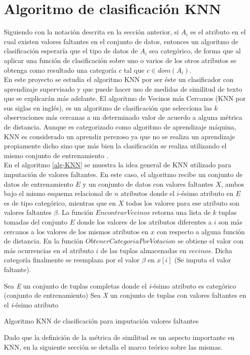\section{Algoritmo de clasificación KNN}
Siguiendo con la notación descrita en la sección anterior, si ${A_{i}}$ es el atributo en el cual existen valores faltantes en el conjunto de datos, entonces un algoritmo de clasificación esperaría que el tipo de datos de ${A_{i}}$ sea categórico, de forma que al aplicar una función de clasificación sobre uno o varios de los otros atributos se obtenga como resultado una categoría ${c}$ tal que ${c \in dom(A_{i})}$.\\
En este proyecto se estudia el algoritmo KNN por ser éste un clasificador con aprendizaje supervisado y que puede hacer uso de medidas de similitud de texto que se explicarán más adelante.
El algoritmo de Vecinos más Cercanos (KNN por sus siglas en inglés), es un algoritmo de clasificación que selecciona las ${k}$ observaciones más cercanas a un determinado valor de acuerdo a alguna métrica de distancia. Aunque es categorizado como algoritmo de aprendizaje máquina, KNN es considerado un aprendiz perezoso ya que no se realiza un aprendizaje propiamente dicho sino que más bien la clasificación se realiza utilizando el mismo conjunto de entrenamiento \cite{mavai2014survey}.\\
En el algoritmo \ref{alg-KNN} se muestra la idea general de KNN utilizado para imputación de valores faltantes. En este caso, el algoritmo recibe un conjunto de datos de entrenamiento $E$ y un conjunto de datos con valores faltantes $X$, ambos bajo el mismo esquema relacional de $n$ atributos donde el $i$-ésimo atributo en $E$ es de tipo categórico, mientras que en $X$ todos los valores para ese atributo son valores faltantes $\beta$. La función $EncontrarVecinos$ retorna una lista de $k$ tuplas tomadas del conjunto $E$ donde los valores de los atributos diferentes a $i$ son más cercanos a los valores de los mismos atributos en $x$ con respecto a alguna función de distancia. En la función $ ObtenerCategoriaPorVotacion$ se obtiene el valor con más ocurrencias en el atributo $i$ de las tuplas almacenadas en $vecinos$. Dicha categoría finalmente se reemplaza por el valor $\beta$ en $x[i]$ (Se imputa el valor faltante). \\
\begin{algorithm}
\label{alg-KNN}
Sea \textit{E} un conjunto de tuplas completas donde el \textit{i}-ésimo atributo es categórico (conjunto de entrenamiento)\;
Sea \textit{X} un conjunto de tuplas con valores faltantes en el  \textit{i}-ésimo atributo\;
\caption{Algoritmo KNN de clasificación para imputación valores faltantes}
\end{algorithm}
Dado que la definición de la métrica de similitud es un aspecto importante en KNN, en la siguiente sección se detalla el marco teórico sobre las mismas.
